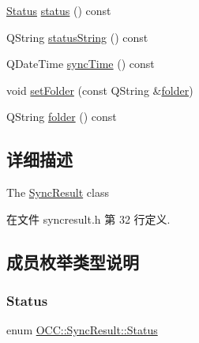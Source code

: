 \begin{DoxyCompactItemize}
\item 
\hyperlink{class_o_c_c_1_1_sync_result_a4f4487ea8c462f2ec90c43bce6df1d1e}{Status} \hyperlink{class_o_c_c_1_1_sync_result_af185f866510a51a15f90f9c765cfb914}{status} () const
\item 
Q\+String \hyperlink{class_o_c_c_1_1_sync_result_a73058225a9f5f6c831e72077631509b9}{status\+String} () const
\item 
Q\+Date\+Time \hyperlink{class_o_c_c_1_1_sync_result_aa709c5c0ff6ac930c634db25e8893a91}{sync\+Time} () const
\item 
void \hyperlink{class_o_c_c_1_1_sync_result_a52ca3cc54ff3d4ba91ce9eb6a9ed5090}{set\+Folder} (const Q\+String \&\hyperlink{class_o_c_c_1_1_sync_result_afd387ea23641d6bf66aa711179a82d5b}{folder})
\item 
Q\+String \hyperlink{class_o_c_c_1_1_sync_result_afd387ea23641d6bf66aa711179a82d5b}{folder} () const
\end{DoxyCompactItemize}


\subsection{详细描述}
The \hyperlink{class_o_c_c_1_1_sync_result}{Sync\+Result} class 

在文件 syncresult.\+h 第 32 行定义.



\subsection{成员枚举类型说明}
\mbox{\label{class_o_c_c_1_1_sync_result_a4f4487ea8c462f2ec90c43bce6df1d1e}} 
\subsubsection{\texorpdfstring{Status}{Status}}
{\footnotesize\ttfamily enum \hyperlink{class_o_c_c_1_1_sync_result_a4f4487ea8c462f2ec90c43bce6df1d1e}{O\+C\+C\+::\+Sync\+Result\+::\+Status}}

